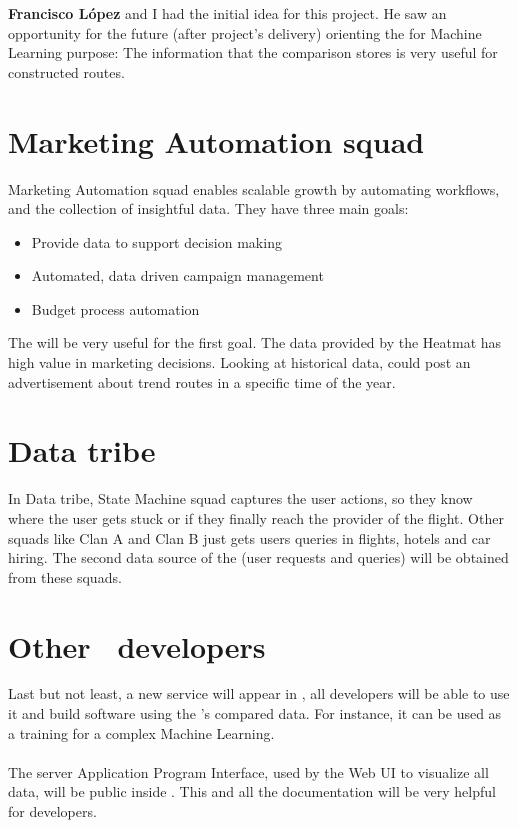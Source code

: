 \textbf{Francisco López} and I had the initial idea for this project. He saw an opportunity for the future (after project's delivery) orienting the \thesistitle for Machine Learning purpose: The information that the comparison stores is very useful for constructed routes.

\section{Marketing Automation squad} \label{mas}

Marketing Automation squad enables scalable growth by automating workflows, and the collection of insightful data. They have three main goals:

\begin{itemize}
  \item Provide data to support decision making
  \item Automated, data driven campaign management
  \item Budget process automation
\end{itemize}

The \thesistitle will be very useful for the first goal. The data provided by the Heatmat has high value in marketing decisions. Looking at historical data,  could post an advertisement about trend routes in a specific time of the year.

\section{Data tribe}

In Data tribe, State Machine squad captures the user actions, so they know where the user gets stuck or if they finally reach the provider of the flight. Other squads like Clan A and Clan B just gets users queries in flights, hotels and car hiring. The second data source of the \thesistitle (user requests and queries) will be obtained from these squads.

\section{Other \company\ developers}

Last but not least, a new service will appear in \company, all developers will be able to use it and build software using the \thesistitle's compared data. For instance, it can be used as a training for a complex Machine Learning\cite{machine_learning_coursera}.
\\\\
The server Application Program Interface, used by the Web UI to visualize all data, will be public inside \company. This and all the documentation will be very helpful for developers.

